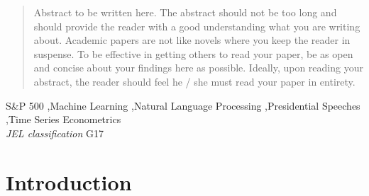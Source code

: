 \documentclass[11pt,preprint, authoryear]{elsarticle}
\numberwithin{equation}{section}
\numberwithin{figure}{section}
\numberwithin{table}{section}
\begin{document}
\begin{frontmatter}  %

\title{}


\begin{abstract}
\small{
Abstract to be written here. The abstract should not be too long and
should provide the reader with a good understanding what you are writing
about. Academic papers are not like novels where you keep the reader in
suspense. To be effective in getting others to read your paper, be as
open and concise about your findings here as possible. Ideally, upon
reading your abstract, the reader should feel he / she must read your
paper in entirety.
}
\end{abstract}

\vspace{1cm}


\begin{keyword}
\footnotesize{
S\&P 500 \sep Machine Learning \sep Natural Language Processing
\sep Presidential Speeches \sep Time Series Econometrics \\
\vspace{0.3cm}
}
\footnotesize{
\textit{JEL classification} G17
}
\end{keyword}



\vspace{0.5cm}

\end{frontmatter}


\renewcommand{\contentsname}{Table of Contents}
{\tableofcontents}

\pagestyle{fancy}
\chead{}
\rhead{}
\lfoot{}
\lhead{}
\cfoot{}


\headsep 35pt %




\hypertarget{introduction}{%
\section{\texorpdfstring{Introduction
\label{Introduction}}{Introduction }}\label{introduction}}
\end{document}
